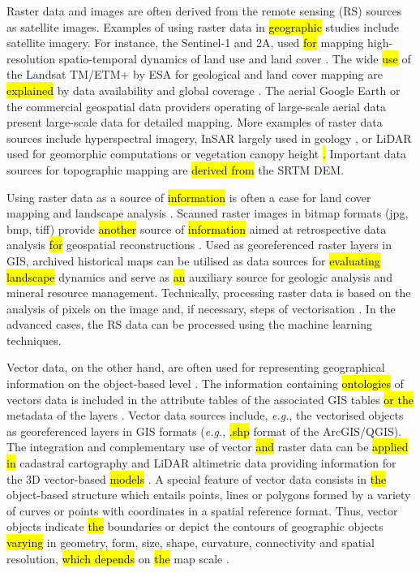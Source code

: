 \documentclass[data,article,submit,pdftex,moreauthors]{Definitions/mdpi}
\begin{document}
Raster data and images are often derived from the remote sensing (RS) sources as satellite images. Examples of using raster\hl{ }data in \hl{geographic} studies include satellite imagery. For instance, the Sentinel-1 and 2A, used \hl{for} mapping high-resolution spatio-temporal dynamics of land use and land cover \cite{MERCIER2021107408,BALENZANO2021107345}. The wide \hl{use} of the Landsat TM/ETM+ by ESA for geological and land cover mapping are \hl{explained} by data availability and global coverage \cite{ALLENBY1987137,LOMBARDO,SAMARA}. The aerial Google Earth or the commercial geospatial data providers operating of large-scale aerial data present large-scale data for detailed mapping. More examples of raster data sources include hyperspectral imagery, InSAR largely used in geology\hl{ } \cite{TALIB2022112793,LI2022114}, or LiDAR used for geomorphic computations or vegetation canopy height \cite{NEUGIRG2016269,NAKAO2022119953}\hl{. }Important\hl{ }data sources for topographic mapping are \hl{derived from} the SRTM DEM. 

Using raster data as a source of \hl{information} is often a case for land cover mapping and landscape analysis \cite{SZABO2019104187,RUJOIUMARE2016244,LI2021112670}. Scanned raster images in bitmap formats (jpg, bmp, tiff) provide \hl{another} source of \hl{information} aimed at retrospective data analysis \hl{for} geospatial reconstructions \cite{KRAL2021107382,OSTAFIN2022107709}. Used as georeferenced raster layers in GIS, archived historical maps can be utilised as data sources for \hl{evaluating landscape} dynamics and serve as \hl{an} auxiliary source for geologic analysis and mineral resource management. Technically, processing raster data is based on the analysis of pixels on the image and, if necessary, steps of vectorisation \cite{8937640,6723417,8810063}. In the advanced cases, the RS data can be processed using the machine learning techniques. 

Vector data, on the other hand, are often used for representing geographical information on the object-based level \cite{LI20121331,KOCH200623}. The information containing \hl{ontologies} of vectors data is included in the attribute tables of the associated GIS tables \hl{or the} metadata of the layers \cite{LI20121344}. Vector data sources include, \emph{e.g.}, the vectorised objects as georeferenced layers in GIS formats (\emph{e.g.}, \hl{.shp} format of the ArcGIS/QGIS). The integration and complementary use of vector \hl{and} raster data can be \hl{applied in} cadastral cartography and LiDAR altimetric data providing information for the 3D vector-based \hl{models} \cite{VIANAFONS2020110258}. A special feature of vector data consists in \hl{the} object-based structure which entails points, lines or polygons formed by a variety of curves or points with coordinates in a spatial reference format. Thus, vector objects indicate \hl{the} boundaries or depict the contours of geographic objects \hl{varying} in geometry, form, size, shape, curvature, connectivity and spatial resolution, \hl{which depends} on \hl{the} map scale \cite{GULER2021107755}.
\end{document}
